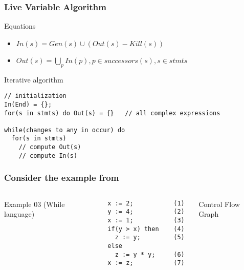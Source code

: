 \begin{frame}[fragile]
  \frametitle{Live Variable Algorithm}

  \begin{block}{Equations}
    \begin{itemize}
    \item $In(s) = Gen(s) \cup (Out(s) - Kill(s))$  
    \item $Out(s) = \bigcup_p In(p), p \in successors(s), s \in stmts$
    \end{itemize}
  \end{block}

  \pause

\begin{block}{Iterative algorithm}
\begin{small}
\begin{verbatim}
// initialization
In(End) = {};
for(s in stmts) do Out(s) = {}   // all complex expressions

while(changes to any in occur) do  
  for(s in stmts)
    // compute Out(s)   
    // compute In(s) 
\end{verbatim}
\end{small}
\end{block}
\end{frame}

\begin{frame}[fragile]
  \frametitle{Consider the example from~\cite{ppa-book}}

    \begin{columns}
Example 03 (While language)
    
\begin{verbatim}
x := 2;           (1)
y := 4;           (2)
x := 1;           (3)
if(y > x) then    (4)
  z := y;         (5) 
else   
  z := y * y;     (6) 
x := z;           (7)
\end{verbatim}

\pause Control Flow Graph

\end{columns}
  
\end{frame}

